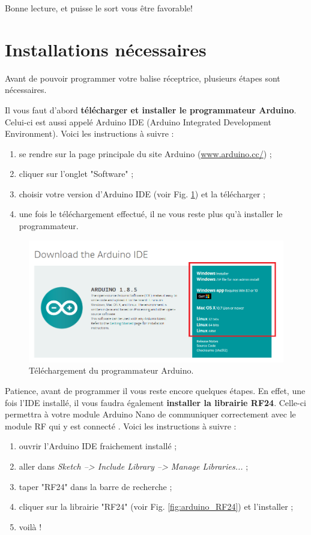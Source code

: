 \documentclass[a4paper,10pt,twoside]{article}
\begin{document}
\begin{center}
Bonne lecture, et puisse le sort vous être favorable!
\end{center}

\section{Installations nécessaires}
Avant de pouvoir programmer votre balise réceptrice, plusieurs étapes sont nécessaires. 

Il vous faut d'abord \textbf{télécharger et installer le programmateur Arduino}. Celui-ci est aussi appelé Arduino IDE (Arduino Integrated Development Environment). Voici les instructions à suivre :
\begin{enumerate}
	\item se rendre sur la page principale du site Arduino (\url{www.arduino.cc/}) ;
	\item cliquer sur l'onglet "Software" ; 
	\item choisir votre version d'Arduino IDE (voir Fig. \ref{fig:arduino_ide}) et la télécharger ;
	\item une fois le téléchargement effectué, il ne vous reste plus qu'à installer le programmateur.
\end{enumerate}

\begin{figure}[ht!]
	\centering
	\includegraphics[width=\textwidth]{imgs/arduino_ide.png}
	\caption{Téléchargement du programmateur Arduino.}
	\label{fig:arduino_ide}
\end{figure}

Patience, avant de programmer il vous reste encore quelques étapes. En effet, une fois l'IDE installé, il vous faudra également \textbf{installer la librairie RF24}. Celle-ci permettra à votre module Arduino Nano de communiquer correctement avec le module RF qui y est connecté . Voici les instructions à suivre :
\begin{enumerate}
	\item ouvrir l'Arduino IDE fraichement installé ;
	\item aller dans \textit{Sketch --> Include Library --> Manage Libraries...} ;
	\item taper "RF24" dans la barre de recherche ;
	\item cliquer sur la librairie "RF24" (voir Fig. \ref{fig:arduino_RF24}) et l'installer ;
	\item voilà ! 
\end{enumerate}
\end{document}
